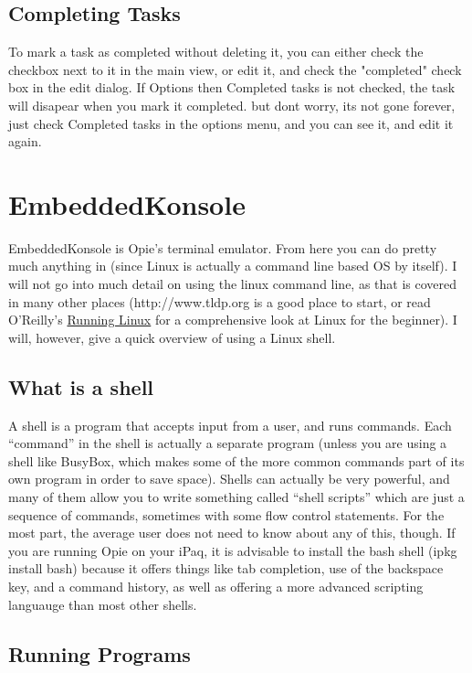 \documentclass[12pt,letterpaper,oneside, openany]{book} \usepackage[latin1] {inputenc}
\begin{document}
\section{Completing Tasks}

To mark a task as completed without deleting it, you can either check the checkbox next to it in the main view, or edit it, and check the "completed" check box in the edit dialog. If Options then Completed tasks is not checked, the task will disapear when you mark it completed. but dont worry, its not gone forever, just check Completed tasks in the options menu, and you can see it, and edit it again.

\chapter{EmbeddedKonsole}
EmbeddedKonsole is Opie's terminal emulator.  From here you can do pretty much anything in (since Linux is actually a command line based OS by itself).  I will not go into much detail on using the linux command line, as that is covered in many other places (http://www.tldp.org is a good place to start, or read O'Reilly's \underline{Running Linux} for a comprehensive look at Linux for the beginner).  I will, however, give a quick overview of using a Linux shell.

\section{What is a shell}

A shell is a program that accepts input from a user, and runs commands.  Each ``command'' in the shell is actually a separate program (unless you are using a shell like BusyBox, which makes some of the more common commands part of its own program in order to save space).  Shells can actually be very powerful, and many of them allow you to write something called ``shell scripts'' which are just a sequence of commands, sometimes with some flow control statements.  For the most part, the average user does not need to know about any of this, though.  If you are running Opie on your iPaq, it is advisable to install the bash shell (ipkg install bash) because it offers things like tab completion, use of the backspace key, and a command history, as well as offering a more advanced scripting languauge than most other shells.

\section{Running Programs}
\end{document}
